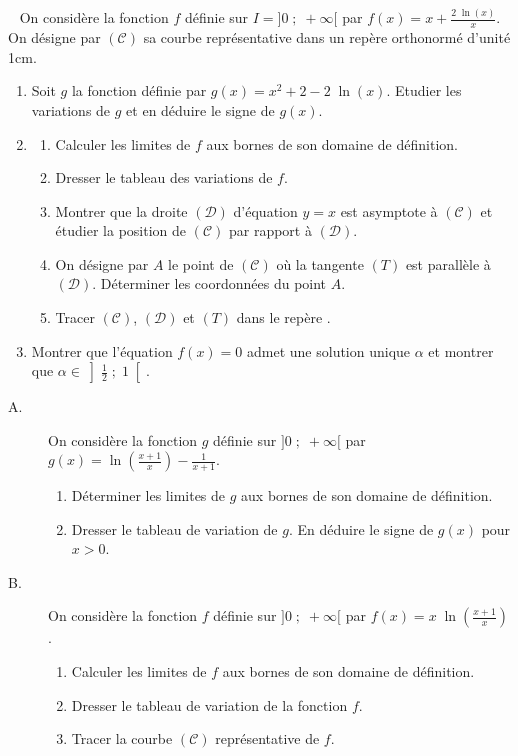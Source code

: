 \begin{exo} ~ \newline
On consid\`ere la fonction $f$ d\'efinie sur $I = ]0 \; ; \; +\infty[$ par $f(x) = x + \frac{2 \; \ln (x) }{x}$.
On d\'esigne par $(\mathscr{C})$ sa courbe repr\'esentative dans un rep\`ere orthonorm\'e \Oij d'unit\'e 1cm.
\begin{enumerate}
\item Soit $g$ la fonction d\'efinie par $g(x) = x^2 + 2 - 2 \; \ln (x)$.
      Etudier les variations de $g$ et en d\'eduire le signe de $g(x)$.
\item \begin{enumerate}
      \item Calculer les limites de $f$ aux bornes de son domaine de d\'efinition.
      \item Dresser le tableau des variations de $f$.
      \item Montrer que la droite $(\mathcal{D})$ d'\'equation $y = x$ est asymptote \`a $(\mathscr{C})$ et 
            \'etudier la position de $(\mathscr{C})$ par rapport \`a $(\mathcal{D})$.
      \item On d\'esigne par $A$ le point de $(\mathscr{C})$ o\`u la tangente $(T)$ est parall\`ele \`a $(\mathcal{D})$.
            D\'eterminer les coordonn\'ees du point $A$.
      \item Tracer $(\mathscr{C})$, $(\mathcal{D})$ et $(T)$ dans le rep\`ere \Oij.
      \end{enumerate}
\item Montrer que l'\'equation $f(x) = 0$ admet une solution unique $\alpha$ et 
      montrer que $\alpha \in \left] \frac{1}{2} \; ; \; 1 \right[$.
\end{enumerate}
\end{exo}
\begin{exo} 
\begin{description}
\item[A.] On consid\`ere la fonction $g$ d\'efinie sur $]0 \; ; \; +\infty[$ par 
      $g(x) = \ln \left( \frac{x+1}{x} \right) - \frac{1}{x+1}$.
      \begin{enumerate}
      \item D\'eterminer les limites de $g$ aux bornes de son domaine de d\'efinition.
      \item Dresser le tableau de variation de $g$.
            En d\'eduire le signe de $g(x)$ pour $x > 0$.
      \end{enumerate}
\item[B.] On consid\`ere la fonction $f$ d\'efinie sur $]0 \; ; \; +\infty[$ par 
      $f(x) = x \; \ln \left( \frac{x+1}{x} \right)$.
      \begin{enumerate}
      \item Calculer les limites de $f$ aux bornes de son domaine de d\'efinition.
      \item Dresser le tableau de variation de la fonction $f$.
      \item Tracer la courbe $(\mathscr{C})$ repr\'esentative de $f$.
      \end{enumerate}
\end{description}
\end{exo}
